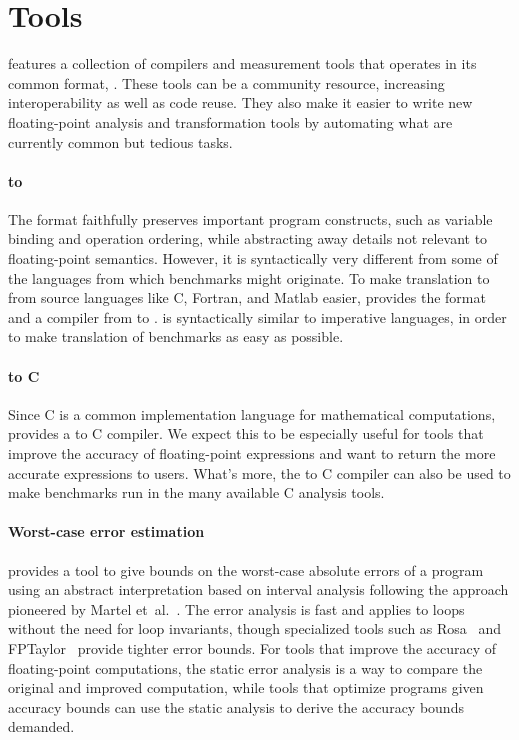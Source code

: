 \documentclass[main.tex]{subfiles}
\begin{document}
\section{Tools}
\label{sec:tools}

\name features
  a collection of compilers and measurement tools
  that operates in its common format, \core.
These tools can be a community resource,
  increasing interoperability as well as code reuse.
They also make it easier to write
  new floating-point analysis and transformation tools
  by automating what are currently
  common but tedious tasks.

\paragraph{\surface to \core}
The \core format faithfully preserves important program constructs,
  such as variable binding and operation ordering,
  while abstracting away details not relevant
  to floating-point semantics.
However, it is syntactically very different
  from some of the languages from which benchmarks might originate.
To make translation to \core from source languages
  like C, Fortran, and Matlab easier,
  \name provides the \surface format
  and a compiler from \surface to \core.
\surface is syntactically similar to imperative languages,
  in order to make translation of benchmarks as easy as possible.

\paragraph{\core to C}
Since C is a common implementation language for mathematical computations,
  \name provides a \core to C compiler.
We expect this to be especially useful for tools
  that improve the accuracy of floating-point expressions
  and want to return the more accurate expressions to users.
What's more, the \core to C compiler can also be used to make \core benchmarks
run in the many available C analysis tools.

\paragraph{Worst-case error estimation}
\name provides a tool to give bounds on
  the worst-case absolute errors of a \core program
  using an abstract interpretation based on interval analysis
  following the approach pioneered by Martel et~al.~\cite{martel-ai}.
The error analysis is fast
  and applies to loops without the need for loop invariants,
  though specialized tools such as Rosa~\cite{DarulovaK14}
  and FPTaylor~\cite{fptaylor-fm15}
  provide tighter error bounds.
For tools that improve the accuracy of floating-point computations,
  the static error analysis is a way to compare
  the original and improved computation,
  while tools that optimize programs given accuracy bounds
  can use the static analysis to derive the accuracy bounds demanded.
\end{document}
